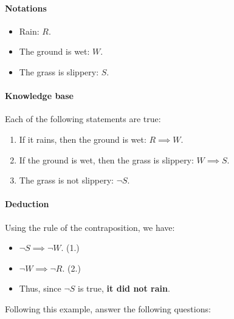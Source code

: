 \documentclass[11pt]{article}
\numberwithin{equation}{section}
\begin{document}
\paragraph{Notations}
\begin{itemize}
    \item Rain: $R$.
    \item The ground is wet: $W$.
    \item The grass is slippery: $S$.
\end{itemize}

\paragraph{Knowledge base} Each of the following statements are true:
\begin{enumerate}
    \item If it rains, then the ground is wet: $R \implies W$.
    \item If the ground is wet, then the grass is slippery: $ W \implies S$.
    \item The grass is not slippery: $\neg S$.
\end{enumerate}

\paragraph{Deduction}
Using the rule of the contraposition, we have:
\begin{itemize}
    \item[] $ \neg S \implies \neg W$. \quad\quad (1.)
    \item[] $ \neg W \implies \neg R$. \quad\quad (2.)
    \item[] Thus, since $\neg S$ is true, \textbf{it did not rain}.
\end{itemize}

\bigskip
Following this example, answer the following questions:
\end{document}

